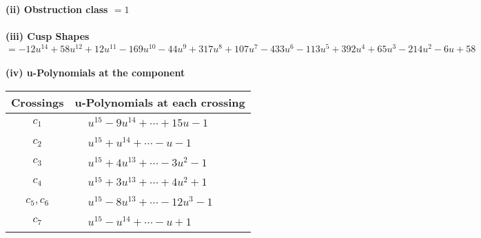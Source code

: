 \documentclass[1p]{elsarticle_modified}
\theoremstyle{definition}
\begin{document}
\flushleft \textbf{(ii) Obstruction class $= 1$}\\~\\
\flushleft \textbf{(iii) Cusp Shapes $= -12 u^{14}+58 u^{12}+12 u^{11}-169 u^{10}-44 u^9+317 u^8+107 u^7-433 u^6-113 u^5+392 u^4+65 u^3-214 u^2-6 u+58$}\\~\\
\newpage\renewcommand{\arraystretch}{1}
\flushleft \textbf{(iv) u-Polynomials at the component}\newline \\
\begin{tabular}{m{50pt}|m{274pt}}
Crossings & \hspace{64pt}u-Polynomials at each crossing \\
\hline $$\begin{aligned}c_{1}\end{aligned}$$&$\begin{aligned}
&u^{15}-9 u^{14}+\cdots+15 u-1
\end{aligned}$\\
\hline $$\begin{aligned}c_{2}\end{aligned}$$&$\begin{aligned}
&u^{15}+u^{14}+\cdots- u-1
\end{aligned}$\\
\hline $$\begin{aligned}c_{3}\end{aligned}$$&$\begin{aligned}
&u^{15}+4 u^{13}+\cdots-3 u^2-1
\end{aligned}$\\
\hline $$\begin{aligned}c_{4}\end{aligned}$$&$\begin{aligned}
&u^{15}+3 u^{13}+\cdots+4 u^2+1
\end{aligned}$\\
\hline $$\begin{aligned}c_{5},c_{6}\end{aligned}$$&$\begin{aligned}
&u^{15}-8 u^{13}+\cdots-12 u^3-1
\end{aligned}$\\
\hline $$\begin{aligned}c_{7}\end{aligned}$$&$\begin{aligned}
&u^{15}- u^{14}+\cdots- u+1
\end{aligned}$\\

\end{tabular}
\end{document}
